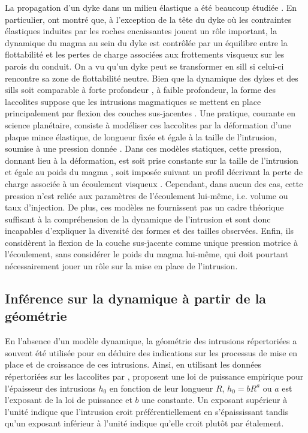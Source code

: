 La propagation d'un dyke dans un milieu élastique a été beaucoup
étudiée \citep{Lister:1991ut,Rubin:1995upa}. En particulier,
\citet{Lister:1991ut} ont montré que, à l'exception de la tête du dyke
où les contraintes élastiques induites par les roches encaissantes
jouent un rôle important, la dynamique du magma au sein du dyke est
contrôlée par un équilibre entre la flottabilité et les pertes de
charge associées aux frottements visqueux sur les parois du conduit.
On a vu qu'un dyke peut se transformer en sill si celui-ci rencontre
sa zone de flottabilité neutre. Bien que la dynamique des dykes et des
sills soit comparable à forte profondeur
\citep{Lister:1991ut,Cruden:tg}, à faible profondeur, la forme des
laccolites suppose que les intrusions magmatiques se mettent en place
principalement par flexion des couches sus-jacentes
\citep{Johnson:1973ho}. Une pratique, courante en science planétaire,
consiste à modéliser ces laccolites par la déformation d'une plaque
mince élastique, de longueur fixée et égale à la taille de
l'intrusion, soumise à une pression donnée \citep{Pollard:1973ho}.
Dans ces modèles statiques, cette pression, donnant lieu à la
déformation, est soit prise constante sur la taille de l'intrusion et
égale au poids du magma
\citep{Pollard:1973ho,Wichman:1996bj,Jozwiak:2012dq}, soit imposée
suivant un profil décrivant la perte de charge associée à un
écoulement visqueux \citep{Kerr:1998eo,Wohler:2009jj}. Cependant, dans
aucun des cas, cette pression n’est reliée aux paramètres de
l’écoulement lui-même, i.e. volume ou taux d’injection. De plus, ces
modèles ne fournissent pas un cadre théorique suffisant à la
compréhension de la dynamique de l'intrusion et sont donc incapables
d'expliquer la diversité des formes et des tailles observées. Enfin,
ils considèrent la flexion de la couche sus-jacente comme unique
pression motrice à l'écoulement, sans considérer le poids du magma
lui-même, qui doit pourtant nécessairement jouer un rôle sur la mise
en place de l'intrusion.

\subsection{Inférence sur la dynamique à partir de la géométrie}

\label{C1-sec:empl-dynam-des}

En l'absence d'un modèle dynamique, la géométrie des intrusions
répertoriées a souvent été utilisée pour en déduire des indications
sur les processus de mise en place et de croissance de ces intrusions.
Ainsi, en utilisant les données répertoriées sur les laccolites par
\citet{E:2015tl}, \citet{McCaffrey:1997ea} proposent une loi de
puissance empirique pour l'épaisseur des intrusions $h_0$ en fonction
de leur longueur $R$, $h_0 = bR^a$ ou $a$ est l'exposant de la loi de
puissance et $b$ une constante. Un exposant supérieur à l'unité
indique que l'intrusion croit préférentiellement en s'épaississant
tandis qu'un exposant inférieur à l'unité indique qu'elle croit plutôt
par étalement.

